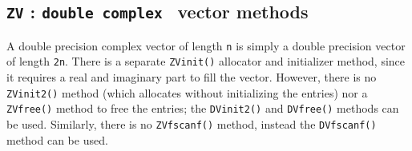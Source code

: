 \par
\subsection{{\tt ZV} : {\tt double complex } vector methods}
\label{subsection:Utilities:proto:ZV}
\par
A double precision complex vector of length {\tt n} 
is simply a double precision vector of length {\tt 2n}.
There is a separate {\tt ZVinit()} allocator and initializer method,
since it requires a real and imaginary part to fill the vector.
However, there is no {\tt ZVinit2()} method (which allocates
without initializing the entries) nor a {\tt ZVfree()} method
to free the entries;
the {\tt DVinit2()} and {\tt DVfree()} methods can be used.
Similarly, there is no {\tt ZVfscanf()} method,
instead the {\tt DVfscanf()} method can be used.
\par

